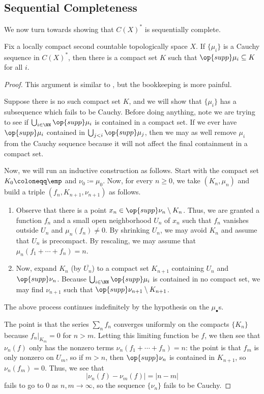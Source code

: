 \documentclass[../notes.tex]{subfiles}
\begin{document}
\subsection{Sequential Completeness}
We now turn towards showing that $C(X)^*$ is sequentially complete.
\begin{lemma} \label{lem:cauchy-seq-supp-in-compact}
	Fix a locally compact second countable topologically space $X$. If $\{\mu_i\}$ is a Cauchy sequence in $C(X)^*$, then there is a compact set $K$ such that $\op{supp}\mu_i\subseteq K$ for all $i$.
\end{lemma}
\begin{proof}
	This argument is similar to , but the bookkeeping is more painful.

	Suppose there is no such compact set $K$, and we will show that $\{\mu_i\}$ has a subsequence which fails to be Cauchy. Before doing anything, note we are trying to see if $\bigcup_{i\in\NN}\op{supp}\mu_i$ is contained in a compact set. If we ever have $\op{supp}\mu_i$ contained in $\bigcup_{j<i}\op{supp}\mu_j$, then we may as well remove $\mu_i$ from the Cauchy sequence because it will not affect the final containment in a compact set.
	
	Now, we will run an inductive construction as follows. Start with the compact set $K_0\coloneqq\emp$ and $\nu_0\coloneqq\mu_0$. Now, for every $n\ge0$, we take $(K_n,\mu_n)$ and build a triple $(f_n,K_{n+1},\nu_{n+1})$ as follows.
	\begin{enumerate}
		\item Observe that there is a point $x_n\in\op{supp}\nu_n\setminus K_n$. Thus, we are granted a function $f_n$ and a small open neighborhood $U_n$ of $x_n$ such that $f_n$ vanishes outside $U_n$ and $\mu_n(f_n)\ne0$. By shrinking $U_n$, we may avoid $K_n$ and assume that $U_n$ is precompact. By rescaling, we may assume that $\mu_n(f_1+\cdots+f_n)=n$.
		\item Now, expand $K_n$ (by $\overline{U_n}$) to a compact set $K_{n+1}$ containing $U_n$ and $\op{supp}\nu_n$. Because $\bigcup_{i\in\NN}\op{supp}\mu_i$ is contained in no compact set, we may find $\nu_{n+1}$ such that $\op{supp}\nu_{n+1}\setminus K_{n+1}$.
	\end{enumerate}
	The above process continues indefinitely by the hypothesis on the $\mu_\bullet$s.

	The point is that the series $\sum_nf_n$ converges uniformly on the compacts $\{K_n\}$ because $f_n|_{K_m}=0$ for $n>m$. Letting this limiting function be $f$, we then see that $\nu_n(f)$ only has the nonzero terms $\nu_n(f_1+\cdots+f_n)=n$: the point is that $f_m$ is only nonzero on $U_m$, so if $m>n$, then $\op{supp}\nu_n$ is contained in $K_{n+1}$, so $\nu_n(f_m)=0$. Thus, we see that
	\[\left|\nu_n(f)-\nu_m(f)\right|=\left|n-m\right|\]
	fails to go to $0$ as $n,m\to\infty$, so the sequence $\{\nu_n\}$ fails to be Cauchy.
\end{proof}
\end{document}
